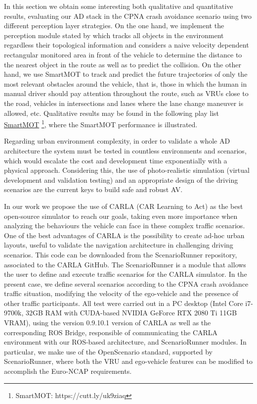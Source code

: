 In this section we obtain some interesting both qualitative and quantitative results, evaluating our AD stack \cite{gomez2021train} in the CPNA crash avoidance scenario using two different perception layer strategies. On the one hand, we implement the perception module stated by \cite{gomez2020real} which tracks all objects in the environment regardless their topological information and considers a naive velocity dependent rectangular monitored area in front of the vehicle to determine the distance to the nearest object in the route as well as to predict the collision. On the other hand, we use SmartMOT to track and predict the future trajectories of only the most relevant obstacles around the vehicle, that is, those in which the human in manual driver should pay attention throughout the route, such as VRUs close to the road, vehicles in intersections and lanes where the lane change maneuver is allowed, etc. Qualitative results may be found in the following play list \href{https://cutt.ly/uk9ziaq}{SmartMOT} \footnote{SmartMOT: https://cutt.ly/uk9ziaq}, where the SmartMOT performance is illustrated. 

Regarding urban environment complexity, in order to validate a whole AD architecture the system must be tested in countless environments and scenarios, which would escalate the cost and development time exponentially with a physical approach. Considering this, the use of photo-realistic simulation (virtual development and validation testing) and an appropriate design of the driving scenarios are the current keys to build safe and robust AV. 

In our work we propose the use of CARLA (CAR Learning to Act) \cite{dosovitskiy2017carla} as the best open-source simulator to reach our goals, taking even more importance when analyzing the behaviours the vehicle can face in these complex traffic scenarios. One of the best advantages of CARLA is the possibility to create ad-hoc urban layouts, useful to validate the navigation architecture in challenging driving scenarios. This code can be downloaded from the ScenarioRunner repository, associated to the CARLA GitHub. The ScenarioRunner is a module that allows the user to define and execute traffic scenarios for the CARLA simulator. In the present case, we define several scenarios according to the CPNA crash avoidance traffic situation, modifying the velocity of the ego-vehicle and the presence of other traffic participants. All test were carried out in a PC desktop (Intel Core i7-9700k, 32GB RAM with CUDA-based NVIDIA GeForce RTX 2080 Ti 11GB VRAM), using the version 0.9.10.1 version of CARLA as well as the corresponding ROS Bridge, responsible of communicating the CARLA environment with our ROS-based architecture, and ScenarioRunner modules. In particular, we make use of the OpenScenario standard, supported by ScenarioRunner, where both the VRU and ego-vehicle features can be modified to accomplish the Euro-NCAP requirements. %

